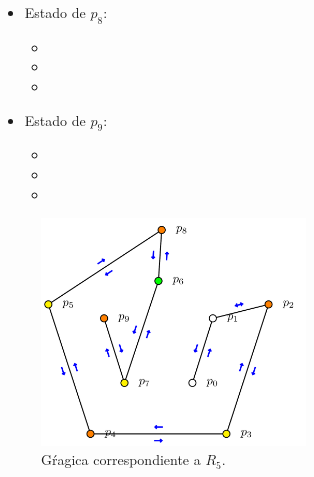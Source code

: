 \begin{multicols}{2}
\begin{itemize}
\begin{itemize}
      \item {}
      \end{itemize}

\item Estado de $p_8$:
      \begin{itemize}
      \item {}
      
      \item {}
      
      \item {}
      \end{itemize}

\item Estado de $p_9$:
      \begin{itemize}
      \item {}
      
      \item {}
      
      \item {}
      \end{itemize}

\end{itemize}
\end{multicols} 
\newpage

\begin{figure}[ht]
        \begin{center}
                \includegraphics[width=7cm]{RD5.png}
                \caption{Gŕagica correspondiente a $R_5$.}
        \end{center}
\end{figure}

